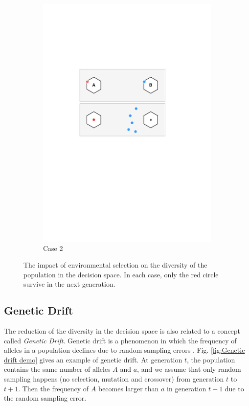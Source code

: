 \documentclass[conference]{IEEEtran}
\begin{document}
\begin{figure}[htbp]
\begin{subfigure}[b]{.24\textwidth}
		\includegraphics[width=\linewidth]{Section3/case2}
		\caption{Case 2}
	\end{subfigure}
	\caption{The impact of environmental selection on the diversity of the population in the decision space. In each case, only the red circle survive in the next generation.}
	\label{fig: Environmental selection}
\end{figure}


\subsection{Genetic Drift}
The reduction of the diversity in the decision space is also related to a concept called \textit{Genetic Drift}. Genetic drift is a phenomenon in which the frequency of alleles in a population declines due to random sampling errors \cite{GeneticDrift}. Fig. \ref{fig:Genetic drift demo} gives an example of genetic drift. At generation $t$, the population contains the same number of alleles $A$ and $a$, and we assume that only random sampling happens (no selection, mutation and crossover) from generation $t$ to $t+1$. Then the frequency of $A$ becomes larger than $a$ in generation $t+1$ due to the random sampling error. 
\end{document}
